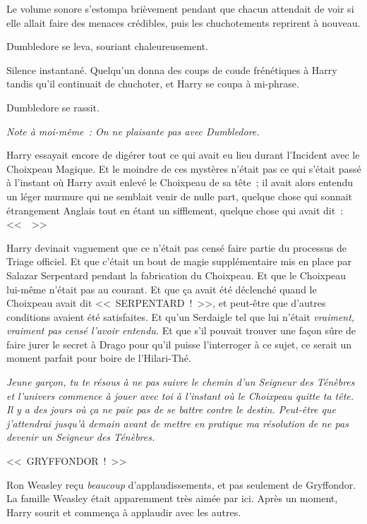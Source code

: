 Le volume sonore s'estompa brièvement pendant que chacun attendait de voir si elle allait faire des menaces crédibles, puis les chuchotements reprirent à nouveau.

Dumbledore se leva, souriant chaleureusement.

Silence instantané. Quelqu'un donna des coups de coude frénétiques à Harry tandis qu'il continuait de chuchoter, et Harry se coupa à mi-phrase.

Dumbledore se rassit.

\emph{Note à moi-même~: On ne plaisante pas avec Dumbledore.}

Harry essayait encore de digérer tout ce qui avait eu lieu durant l'Incident avec le Choixpeau Magique. Et le moindre de ces mystères n'était pas ce qui s'était passé à l'instant où Harry avait enlevé le Choixpeau de sa tête~; il avait alors entendu un léger murmure qui ne semblait venir de nulle part, quelque chose qui sonnait étrangement Anglais tout en étant un sifflement, quelque chose qui avait dit~: <<~~>>

Harry devinait vaguement que ce n'était pas censé faire partie du processus de Triage officiel. Et que c'était un bout de magie supplémentaire mis en place par Salazar Serpentard pendant la fabrication du Choixpeau. Et que le Choixpeau lui-même n'était pas au courant. Et que ça avait été déclenché quand le Choixpeau avait dit <<~SERPENTARD~!~>>, et peut-être que d'autres conditions avaient été satisfaites. Et qu'un Serdaigle tel que lui n'était \emph{vraiment, vraiment pas censé l'avoir entendu.} Et que s'il pouvait trouver une façon sûre de faire jurer le secret à Drago pour qu'il puisse l'interroger à ce sujet, ce serait un moment parfait pour boire de l'Hilari-Thé.

\emph{Jeune garçon, tu te résous à ne pas suivre le chemin d'un Seigneur des Ténèbres et l'univers commence à jouer avec toi à l'instant où le Choixpeau quitte ta tête. Il y a des jours où ça ne paie pas de se battre contre le destin. Peut-être que j'attendrai jusqu'à demain avant de mettre en pratique ma résolution de ne pas devenir un Seigneur des Ténèbres.}

<<~GRYFFONDOR~!~>>

Ron Weasley reçu \emph{beaucoup} d'applaudissements, et pas seulement de Gryffondor. La famille Weasley était apparemment très aimée par ici. Après un moment, Harry sourit et commença à applaudir avec les autres.

